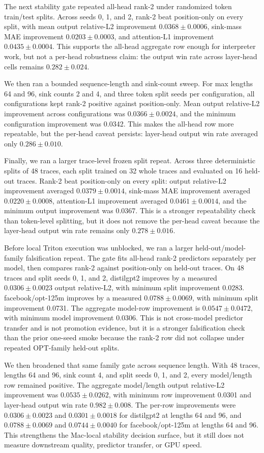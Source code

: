 \documentclass{article}
\begin{document}
The next stability gate repeated all-head rank-2 under randomized token
train/test splits. Across seeds 0, 1, and 2, rank-2 beat position-only on every
split, with mean output relative-L2 improvement $0.0368 \pm 0.0006$,
sink-mass MAE improvement $0.0203 \pm 0.0003$, and attention-L1 improvement
$0.0435 \pm 0.0004$. This supports the all-head aggregate row enough for
interpreter work, but not a per-head robustness claim: the output win rate
across layer-head cells remains $0.282 \pm 0.024$.

We then ran a bounded sequence-length and sink-count sweep. For max lengths
64 and 96, sink counts 2 and 4, and three token split seeds per configuration,
all configurations kept rank-2 positive against position-only. Mean output
relative-L2 improvement across configurations was $0.0366 \pm 0.0024$, and the
minimum configuration improvement was 0.0342. This makes the all-head row more
repeatable, but the per-head caveat persists: layer-head output win rate
averaged only $0.286 \pm 0.010$.

Finally, we ran a larger trace-level frozen split repeat. Across three
deterministic splits of 48 traces, each split trained on 32 whole traces and
evaluated on 16 held-out traces. Rank-2 beat position-only on every split:
output relative-L2 improvement averaged $0.0379 \pm 0.0014$, sink-mass MAE
improvement averaged $0.0220 \pm 0.0008$, attention-L1 improvement averaged
$0.0461 \pm 0.0014$, and the minimum output improvement was 0.0367. This is a
stronger repeatability check than token-level splitting, but it does not remove
the per-head caveat because the layer-head output win rate remains only
$0.278 \pm 0.016$.

Before local Triton execution was unblocked, we ran a larger held-out/model-family
falsification repeat. The gate fits all-head rank-2 predictors separately per
model, then compares rank-2 against position-only on held-out traces. On 48
traces and split seeds 0, 1, and 2,
distilgpt2 improves by a measured $0.0306 \pm 0.0023$ output relative-L2, with minimum
split improvement 0.0283. facebook/opt-125m improves by a measured $0.0788 \pm 0.0069$,
with minimum split improvement 0.0731. The aggregate model-row improvement is
$0.0547 \pm 0.0472$, with minimum model improvement 0.0306. This is not
cross-model predictor transfer and is not promotion evidence, but it is a
stronger falsification check than the prior one-seed smoke because the rank-2
row did not collapse under repeated OPT-family held-out splits.

We then broadened that same family gate across sequence length. With 48 traces,
lengths 64 and 96, sink count 4, and split seeds 0, 1, and 2, every
model/length row remained positive. The aggregate model/length output
relative-L2 improvement was $0.0535 \pm 0.0262$, with minimum row improvement
0.0301 and layer-head output win rate $0.982 \pm 0.008$. The per-row
improvements were $0.0306 \pm 0.0023$ and $0.0301 \pm 0.0018$ for distilgpt2 at
lengths 64 and 96, and $0.0788 \pm 0.0069$ and $0.0744 \pm 0.0040$ for
facebook/opt-125m at lengths 64 and 96. This strengthens the Mac-local
stability decision surface, but it still does not measure downstream quality,
predictor transfer, or GPU speed.
\end{document}

